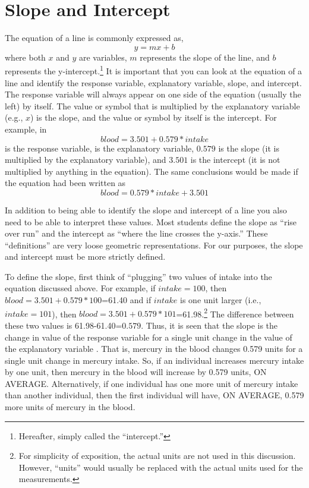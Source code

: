 \documentclass[10pt,openany]{book}\usepackage[]{graphicx}\usepackage[]{color}
\begin{document}
\section{Slope and Intercept}
The equation of a line is commonly expressed as,
  \[ y = mx + b  \]
where both $x$ and $y$ are variables, $m$ represents the slope of the line, and $b$ represents the y-intercept.\footnote{Hereafter, simply called the ``intercept.''}  It is important that you can look at the equation of a line and identify the response variable, explanatory variable, slope, and intercept.  The response variable will always appear on one side of the equation (usually the left) by itself.   The value or symbol that is multiplied by the explanatory variable (e.g., $x$) is the slope, and the value or symbol by itself is the intercept.  For example, in
\[ blood = 3.501 + 0.579*intake \]
 is the response variable,  is the explanatory variable, $0.579$ is the slope (it is multiplied by the explanatory variable), and $3.501$ is the intercept (it is not multiplied by anything in the equation).  The same conclusions would be made if the equation had been written as
  \[ blood = 0.579*intake+3.501 \]


In addition to being able to identify the slope and intercept of a line you also need to be able to interpret these values.  Most students define the slope as ``rise over run'' and the intercept as ``where the line crosses the y-axis.''  These ``definitions'' are very loose geometric representations.  For our purposes, the slope and intercept must be more strictly defined.

To define the slope, first think of ``plugging'' two values of intake into the equation discussed above.  For example, if $intake=100$, then $blood=3.501+0.579*100$=61.40 and if $intake$ is one unit larger (i.e., $intake=101$), then $blood=3.501+0.579*101$=61.98.\footnote{For simplicity of exposition, the actual units are not used in this discussion. However, ``units'' would usually be replaced with the actual units used for the measurements.}  The difference between these two values is 61.98-61.40=$0.579$.  Thus, it is seen that the slope is the change in value of the response variable for a single unit change in the value of the explanatory variable .  That is, mercury in the blood changes 0.579 units for a single unit change in mercury intake.  So, if an individual increases mercury intake by one unit, then mercury in the blood will increase by 0.579 units, ON AVERAGE.  Alternatively, if one individual has one more unit of mercury intake than another individual, then the first individual will have, ON AVERAGE, 0.579 more units of mercury in the blood.
\end{document}
